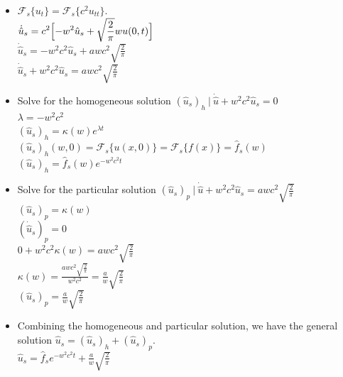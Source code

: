 \documentclass[10pt]{article}
\begin{document}
\begin{itemize}
    \item $ \mathcal{F}_{s}\{ u_{t} \} = \mathcal{F}_{s}\{ c^2 u_{tt} \} $. \\
    \subitem $ \displaystyle \dot{\hat{u}}_{s} = c^2\Bigl[-w^{2}\hat{u}_{s} + \sqrt{\frac{2}{\pi}}wu(0,t) \Bigr] $ \\
    \subitem $ \displaystyle \dot{\hat{u}}_{s} = -w^2c^2\hat{u}_{s} + awc^2\sqrt{\frac{2}{\pi}} $ \\
    \subitem $ \displaystyle \dot{\hat{u}}_{s} + w^2c^2\hat{u}_{s} = awc^2\sqrt{\frac{2}{\pi}} $ \\
    \item Solve for the homogeneous solution $ (\hat{u}_{s})_{h} \ | \ \dot{\hat{u}} + w^2c^2\hat{u}_{s} = 0 $ \\
    \subitem $ \displaystyle \lambda = -w^2c^2 $ \\
    \subitem $ \displaystyle (\hat{u}_{s})_{h} = \kappa(w)e^{\lambda t} $ \\
    \subitem $ \displaystyle (\hat{u}_{s})_{h}(w,0) = \mathcal{F}_{s}\{ u(x,0) \} = \mathcal{F}_{s}\{ f(x) \} = \hat{f}_{s}(w) $ \\
    \subitem $ \displaystyle (\hat{u}_{s})_{h} = \hat{f}_{s}(w)e^{-w^2c^2t} $ \\
    \item Solve for the particular solution $ (\hat{u}_{s})_{p} \ | \ \dot{\hat{u}} + w^2c^2\hat{u}_{s} = awc^2\sqrt{\frac{2}{\pi}} $ \\
    \subitem $ \displaystyle (\hat{u}_{s})_{p} = \kappa(w) $ \\
    \subitem $ \displaystyle (\dot{\hat{u}}_{s})_{p} = 0 $ \\
    \subitem $ \displaystyle 0 + w^2c^2\kappa(w) = awc^2\sqrt{\frac{2}{\pi}} $ \\
    \subitem $ \displaystyle \kappa(w) = \frac{awc^2\sqrt{\frac{2}{\pi}}}{w^2c^2} = \frac{a}{w}\sqrt{\frac{2}{\pi}} $ \\
    \subitem $ \displaystyle (\hat{u}_{s})_{p} = \frac{a}{w}\sqrt{\frac{2}{\pi}} $ \\
    \item Combining the homogeneous and particular solution, we have the general solution $ \displaystyle \hat{u}_{s} = (\hat{u}_{s})_{h} + (\hat{u}_{s})_{p} $. \\
    \subitem $ \displaystyle \hat{u}_{s} = \hat{f}_{s}e^{-w^2c^2t} + \frac{a}{w}\sqrt{\frac{2}{\pi}} $ \\


\end{itemize}
\end{document}
